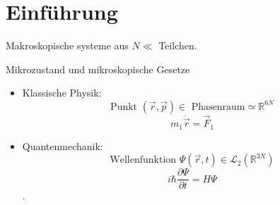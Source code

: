 \documentclass[11pt]{article}
\theoremstyle{plain}
\newcommand{\R}{\mathbb{R}}
\newcommand{\pd}[2]{\frac{\partial #1 }{\partial #2}}
\begin{document}
\section{Einf\"uhrung}
\begin{description}
  \item Makroskopische systeme aus $N \ll $ Teilchen.
  \item Mikrozustand und mikroskopische Gesetze
    \begin{itemize}
      \item Klassische Physik: 
        \[\text{Punkt } (\vec{r}, \vec{p}) \in \text{ Phasenraum} \simeq \R^{6N} \]
        \[ m_1 \ddot{\vec{r}} = \vec{F}_1 \]
      \item Quantenmechanik: 
        \[ \text{Wellenfunktion } \Psi (\vec{r},t) \in \mathcal {L}_2 (\R^{3N}) \]
        \[ i \hbar \pd{\Psi}{t}= H \Psi \]. 
    \end{itemize}
    

\end{description}
\end{document}
